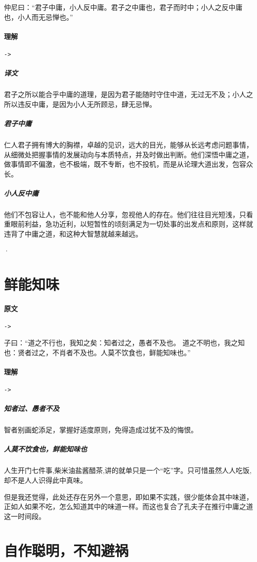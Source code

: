 \documentclass[UTF8,a4paper,8pt]{ctexbook}
\begin{document}
				仲尼曰：“君子中庸，小人反中庸。君子之中庸也，君子而时中；小人之反中庸也，小人而无忌惮也。”
				
			\paragraph{理解}\verb|->|
				\subparagraph{译文}君子之所以能合乎中庸的道理，是因为君子能随时守住中道，无过无不及；小人之所以违反中庸，是因为小人无所顾忌，肆无忌惮。

				\subparagraph{君子中庸}仁人君子拥有博大的胸襟，卓越的见识，远大的目光，能够从长远考虑问题事情，从细微处把握事情的发展动向与本质特点，并及时做出判断。他们深悟中庸之道，做事情即不偏激，也不极端，既不专断，也不投机，而是从论理大道出发，包容众长。
				
				\subparagraph{小人反中庸}他们不包容让人，也不能和他人分享，忽视他人的存在。他们往往目光短浅，只看重眼前利益，急功近利，以短暂性的顷刻满足为一切处事的出发点和原则，这样就违背了中庸之道，和这种大智慧就越来越远。
				
·		\section{鲜能知味}
			\paragraph{原文}\verb|->|
				
				子曰：“道之不行也，我知之矣：知者过之，愚者不及也。 道之不明也，我之知也：贤者过之，不肖者不及也。人莫不饮食也，鲜能知味也。”
				
			\paragraph{理解}\verb|->|
			
				\subparagraph{知者过、愚者不及}智者别画蛇添足，掌握好适度原则，免得造成过犹不及的悔恨。
				
				\subparagraph{人莫不饮食也，鲜能知味也} 人生开门七件事,柴米油盐酱醋茶,讲的就单只是一个“吃”字。只可惜虽然人人吃饭,却不是人人识得此中真味。
				
				但是我还觉得，此处还存在另外一个意思，即如果不实践，很少能体会其中味道，正如人如果不吃，怎么知道其中的味道一样。而这也复合了孔夫子在推行中庸之道这一时间段。
	
	\section{自作聪明，不知避祸}
\end{document}
